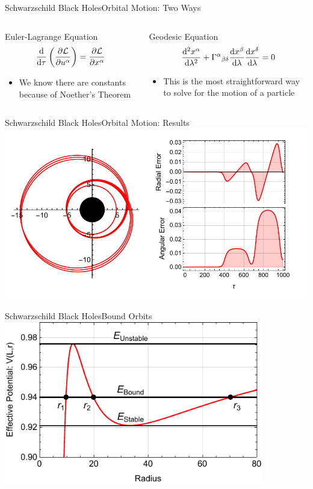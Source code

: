 \documentclass[12pt]{beamer}
\begin{document}
\begin{frame}{Schwarzschild Black Holes}{Orbital Motion: Two Ways}
\begin{columns}[c]
\begin{column}{0.5\textwidth}
\centering
Euler-Lagrange Equation
$$\odv{}{\tau}\left(\pdv{\mathcal{L}}{u^\alpha}\right)=\pdv{\mathcal{L}}{x^\alpha}$$
\begin{itemize}
    \item We know there are constants because of Noether's Theorem
\end{itemize}
\end{column}
\vrule{}
\begin{column}{0.5\textwidth}
\centering
Geodesic Equation
$$\odv[order=2]{x^\alpha}{\lambda} + \Gamma^\alpha{}_{\beta\delta}\odv{x^\beta}{\lambda}\odv{x^\delta}{\lambda}=0$$
\begin{itemize}
    \item This is the most straightforward way to solve for the motion of a particle
\end{itemize}
\end{column}
\end{columns}
\end{frame}

\begin{frame}{Schwarzschild Black Holes}{Orbital Motion: Results}
\centering\includegraphics[width=\textwidth]{MatchedOrbits.pdf}
\end{frame}

\begin{frame}{Schwarzschild Black Holes}{Bound Orbits}
\centering\includegraphics[width=0.85\textwidth]{RadialPotentialPE.pdf}
\end{frame}
\end{document}
